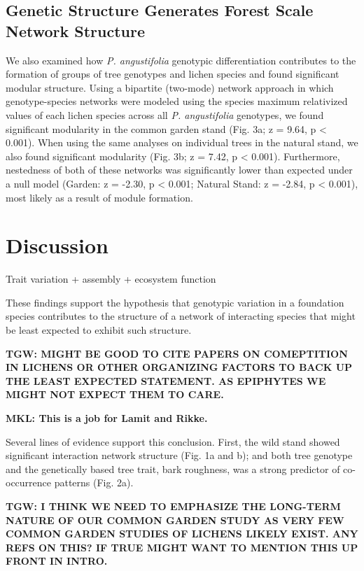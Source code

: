 \documentclass[fleqn,10pt]{wlscirep}
\begin{document}
\subsection*{Genetic Structure Generates Forest Scale Network Structure}

We also examined how \textit{P. angustifolia} genotypic
differentiation contributes to the formation of groups of tree
genotypes and lichen species and found significant modular
structure. Using a bipartite (two-mode) network approach in which
genotype-species networks were modeled using the species maximum
relativized values of each lichen species across all
\textit{P. angustifolia} genotypes, we found significant modularity in
the common garden stand (Fig. 3a; z = 9.64, p < 0.001). When using the
same analyses on individual trees in the natural stand, we also found
significant modularity (Fig. 3b; z = 7.42, p < 0.001). Furthermore,
nestedness of both of these networks was significantly lower than
expected under a null model (Garden: z = -2.30, p < 0.001; Natural
Stand: z = -2.84, p < 0.001), most likely as a result of module
formation.


\section*{Discussion}


Trait variation + assembly + ecosystem function

These findings support the hypothesis that genotypic variation in a
foundation species contributes to the structure of a network of
interacting species that might be least expected to exhibit such
structure. 

\textbf{TGW: MIGHT BE GOOD TO CITE PAPERS ON COMEPTITION IN LICHENS OR
OTHER ORGANIZING FACTORS TO BACK UP THE LEAST EXPECTED STATEMENT.  AS
EPIPHYTES WE MIGHT NOT EXPECT THEM TO CARE.}

\textbf{MKL: This is a job for Lamit and Rikke.}

Several lines of evidence support this conclusion. First, the wild
stand showed significant interaction network structure (Fig. 1a and
b); and both tree genotype and the genetically based tree trait, bark
roughness, was a strong predictor of co-occurrence patterns
(Fig. 2a). 

\textbf{TGW: I THINK WE NEED TO EMPHASIZE THE LONG-TERM NATURE OF OUR
COMMON GARDEN STUDY AS VERY FEW COMMON GARDEN STUDIES OF LICHENS
LIKELY EXIST. ANY REFS ON THIS? IF TRUE MIGHT WANT TO MENTION THIS UP
FRONT IN INTRO.}
\end{document}
